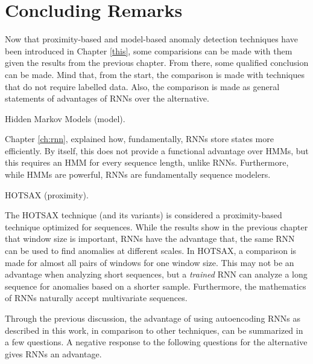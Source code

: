 \chapter{Concluding Remarks}

Now that proximity-based and model-based anomaly detection techniques have been introduced in Chapter \ref{this}, some comparisions can be made with them given the results from the previous chapter.
%
From there, some qualified conclusion can be made.
%
Mind that, from the start, the comparison is made with techniques that do not require labelled data.
%
Also, the comparison is made as general statements of advantages of RNNs over the alternative.

\begin{description}


\item Hidden Markov Models (model).

      Chapter \ref{ch:rnn}, explained how, fundamentally, RNNs store states more efficiently.
      By itself, this does not provide a functional advantage over HMMs, but this requires an HMM for every sequence length, unlike RNNs.
      Furthermore, while HMMs are powerful, RNNs are fundamentally sequence modelers.


\item HOTSAX (proximity).

      The HOTSAX \cite{Keogh2005} technique (and its variants) is considered a proximity-based technique optimized for sequences.
      While the results show in the previous chapter that window size is important, RNNs have the advantage that, the same RNN can be used to find anomalies at different scales.
      In HOTSAX, a comparison is made for almost all pairs of windows for one window size.
      This may not be an advantage when analyzing short sequences, but a \emph{trained} RNN can analyze a long sequence for anomalies based on a shorter sample.
      Furthermore, the mathematics of RNNs naturally accept multivariate sequences.


\end{description}


Through the previous discussion, the advantage of using autoencoding RNNs as described in this work, in comparison to other techniques, can be summarized in a few questions.
%
A negative response to the following questions for the alternative gives RNNs an advantage.


